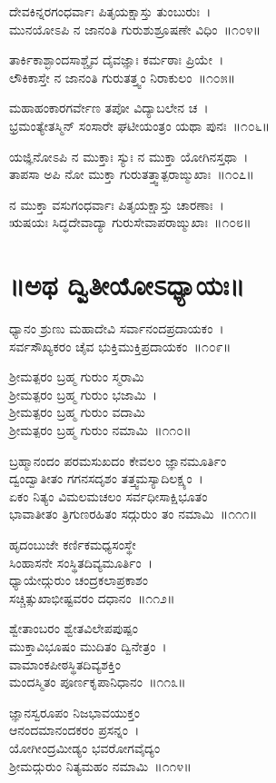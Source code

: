 ದೇವಕಿನ್ನರಗಂಧರ್ವಾಃ ಪಿತೃಯಕ್ಷಾಸ್ತು ತುಂಬುರುಃ~।\\
ಮುನಯೋಽಪಿ ನ ಜಾನಂತಿ ಗುರುಶುಶ್ರೂಷಣೇ ವಿಧಿಂ~॥೧೦೪॥

ತಾರ್ಕಿಕಾಶ್ಛಾಂದಸಾಶ್ಚೈವ ದೈವಜ್ಞಾಃ ಕರ್ಮಠಾಃ ಪ್ರಿಯೇ~।\\
ಲೌಕಿಕಾಸ್ತೇ ನ ಜಾನಂತಿ ಗುರುತತ್ತ್ವಂ ನಿರಾಕುಲಂ~॥೧೦೫॥

ಮಹಾಹಂಕಾರಗರ್ವೇಣ ತಪೋ ವಿದ್ಯಾಬಲೇನ ಚ~।\\
ಭ್ರಮಂತ್ಯೇತಸ್ಮಿನ್ ಸಂಸಾರೇ ಘಟೀಯಂತ್ರಂ ಯಥಾ ಪುನಃ~॥೧೦೬॥

ಯಜ್ಞಿನೋಽಪಿ ನ ಮುಕ್ತಾಃ ಸ್ಯುಃ ನ ಮುಕ್ತಾ ಯೋಗಿನಸ್ತಥಾ~।\\
ತಾಪಸಾ ಅಪಿ ನೋ ಮುಕ್ತಾ ಗುರುತತ್ತ್ವಾತ್ಪರಾಙ್ಮುಖಾಃ~॥೧೦೭॥

ನ ಮುಕ್ತಾ ವಸುಗಂಧರ್ವಾಃ ಪಿತೃಯಕ್ಷಾಸ್ತು ಚಾರಣಾಃ~।\\
ಋಷಯಃ ಸಿದ್ಧದೇವಾದ್ಯಾ ಗುರುಸೇವಾಪರಾಙ್ಮುಖಾಃ~॥೧೦೮॥

\section{॥ಅಥ ದ್ವಿತೀಯೋಽಧ್ಯಾಯಃ॥}

ಧ್ಯಾನಂ ಶ್ರುಣು ಮಹಾದೇವಿ ಸರ್ವಾನಂದಪ್ರದಾಯಕಂ~।\\
ಸರ್ವಸೌಖ್ಯಕರಂ ಚೈವ ಭುಕ್ತಿಮುಕ್ತಿಪ್ರದಾಯಕಂ~॥೧೦೯॥

ಶ್ರೀಮತ್ಪರಂ ಬ್ರಹ್ಮ ಗುರುಂ ಸ್ಮರಾಮಿ\\ ಶ್ರೀಮತ್ಪರಂ ಬ್ರಹ್ಮ ಗುರುಂ ಭಜಾಮಿ~।\\
ಶ್ರೀಮತ್ಪರಂ ಬ್ರಹ್ಮ ಗುರುಂ ವದಾಮಿ\\ ಶ್ರೀಮತ್ಪರಂ ಬ್ರಹ್ಮ ಗುರುಂ ನಮಾಮಿ~॥೧೧೦॥

ಬ್ರಹ್ಮಾನಂದಂ ಪರಮಸುಖದಂ ಕೇವಲಂ ಜ್ಞಾನಮೂರ್ತಿಂ\\
ದ್ವಂದ್ವಾತೀತಂ ಗಗನಸದೃಶಂ ತತ್ತ್ವಮಸ್ಯಾದಿಲಕ್ಷ್ಯಂ~।\\
ಏಕಂ ನಿತ್ಯಂ ವಿಮಲಮಚಲಂ ಸರ್ವಧೀಸಾಕ್ಷಿಭೂತಂ\\
ಭಾವಾತೀತಂ ತ್ರಿಗುಣರಹಿತಂ ಸದ್ಗುರುಂ ತಂ ನಮಾಮಿ~॥೧೧೧॥

ಹೃದಂಬುಜೇ ಕರ್ಣಿಕಮಧ್ಯಸಂಸ್ಥೇ\\ ಸಿಂಹಾಸನೇ ಸಂಸ್ಥಿತದಿವ್ಯಮೂರ್ತಿಂ~।\\
ಧ್ಯಾಯೇದ್ಗುರುಂ ಚಂದ್ರಕಲಾಪ್ರಕಾಶಂ\\ ಸಚ್ಚಿತ್ಸುಖಾಭೀಷ್ಟವರಂ ದಧಾನಂ~॥೧೧೨॥

ಶ್ವೇತಾಂಬರಂ ಶ್ವೇತವಿಲೇಪಪುಷ್ಪಂ\\ ಮುಕ್ತಾವಿಭೂಷಂ ಮುದಿತಂ ದ್ವಿನೇತ್ರಂ~।\\
ವಾಮಾಂಕಪೀಠಸ್ಥಿತದಿವ್ಯಶಕ್ತಿಂ\\ ಮಂದಸ್ಮಿತಂ ಪೂರ್ಣಕೃಪಾನಿಧಾನಂ~॥೧೧೩॥

ಜ್ಞಾನಸ್ವರೂಪಂ ನಿಜಭಾವಯುಕ್ತಂ\\ ಆನಂದಮಾನಂದಕರಂ ಪ್ರಸನ್ನಂ~।\\
ಯೋಗೀಂದ್ರಮೀಡ್ಯಂ ಭವರೋಗವೈದ್ಯಂ\\ ಶ್ರೀಮದ್ಗುರುಂ ನಿತ್ಯಮಹಂ ನಮಾಮಿ~॥೧೧೪॥

